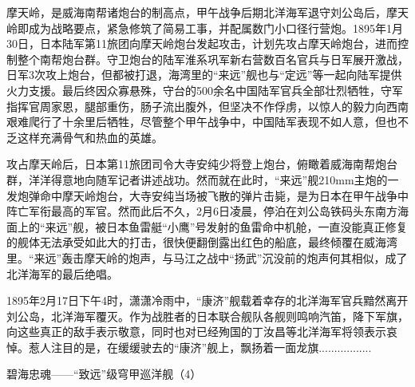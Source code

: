 \documentclass[12pt,UTF8]{ctexbook}
\begin{document}
摩天岭，是威海南帮诸炮台的制高点，甲午战争后期北洋海军退守刘公岛后，摩天岭即成为战略要点，紧急修筑了简易工事，并配属数门小口径行营炮。1895年1月30日，日本陆军第11旅团向摩天岭炮台发起攻击，计划先攻占摩天岭炮台，进而控制整个南帮炮台群。守卫炮台的陆军淮系巩军新右营数百名官兵与日军展开激战，日军3次攻上炮台，但都被打退，海湾里的“来远”舰也与“定远”等一起向陆军提供火力支援。最后终因众寡悬殊，守台的500余名中国陆军官兵全部壮烈牺牲，守军指挥官周家恩，腿部重伤，肠子流出腹外，但坚决不作俘虏，以惊人的毅力向西南艰难爬行了十余里后牺牲，尽管整个甲午战争中，中国陆军表现不如人意，但也不乏这样充满骨气和热血的英雄。

攻占摩天岭后，日本第11旅团司令大寺安纯少将登上炮台，俯瞰着威海南帮炮台群，洋洋得意地向随军记者讲述战功。然而就在此时，“来远”舰210mm主炮的一发炮弹命中摩天岭炮台，大寺安纯当场被飞散的弹片击毙，是为日本在甲午战争中阵亡军衔最高的军官。然而此后不久，2月6日凌晨，停泊在刘公岛铁码头东南方海面上的“来远”舰，被日本鱼雷艇“小鹰”号发射的鱼雷命中机舱，一直没能真正修复的舰体无法承受如此大的打击，很快便翻倒露出红色的船底，最终倾覆在威海湾里。“来远”轰击摩天岭的炮声，与马江之战中“扬武”沉没前的炮声何其相似，成了北洋海军的最后绝唱。

1895年2月17日下午4时，潇潇冷雨中，“康济”舰载着幸存的北洋海军官兵黯然离开刘公岛，北洋海军覆灭。作为战胜者的日本联合舰队各舰则鸣响汽笛，降下军旗，向这些真正的敌手表示敬意，同时也对已经殉国的丁汝昌等北洋海军将领表示哀悼。惹人注目的是，在缓缓驶去的“康济”舰上，飘扬着一面龙旗.................







碧海忠魂——“致远”级穹甲巡洋舰（4）
\end{document}
